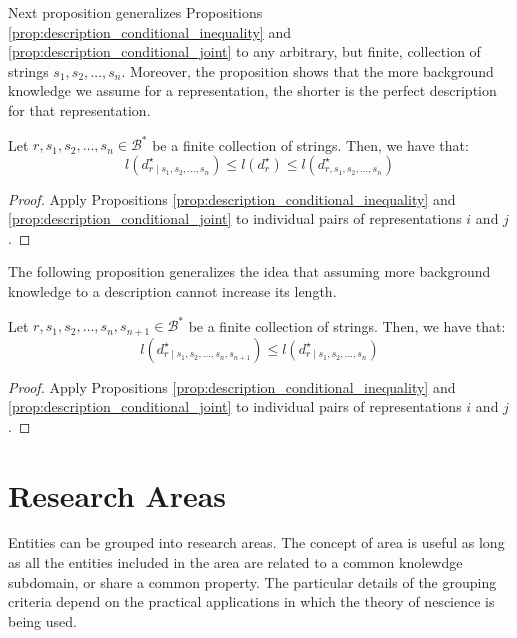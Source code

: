 Next proposition generalizes Propositions \ref{prop:description_conditional_inequality} and \ref{prop:description_conditional_joint} to any arbitrary, but finite, collection of strings $s_1, s_2, \ldots, s_n$. Moreover, the proposition shows that the more background knowledge we assume for a representation, the shorter is the perfect description for that representation.

\begin{proposition}
Let $r, s_1, s_2, \ldots, s_n \in \mathcal{B}^\ast$ be a finite collection of strings. Then, we have that:
\[
l \left( d^\star_{r \mid s_1, s_2, \ldots, s_n} \right) \leq l \left( d^\star_r \right) \leq l \left( d^\star_{r,s_1, s_2, \ldots, s_n} \right)
\]
\end{proposition}
\begin{proof}
Apply Propositions \ref{prop:description_conditional_inequality} and \ref{prop:description_conditional_joint} to individual pairs of representations $i$ and $j$.
\end{proof}

The following proposition generalizes the idea that assuming more background knowledge to a description cannot increase its length.

\begin{proposition}
Let $r, s_1, s_2, \ldots, s_n, s_{n+1} \in \mathcal{B}^\ast$ be a finite collection of strings. Then, we have that:
\[
l \left( d^\star_{r \mid s_1, s_2, \ldots, s_n, s_{n+1}} \right) \leq l \left( d^\star_{r \mid s_1, s_2, \ldots, s_n} \right)
\]
\end{proposition}
\begin{proof}
Apply Propositions \ref{prop:description_conditional_inequality} and \ref{prop:description_conditional_joint} to individual pairs of representations $i$ and $j$.
\end{proof}

%
%

\section{Research Areas}
\label{sec:areas}

Entities can be grouped into research areas. The concept of area is useful as long as all the entities included in the area are related to a common knolewdge subdomain, or share a common property. The particular details of the grouping criteria depend on the practical applications in which the theory of nescience is being used.

